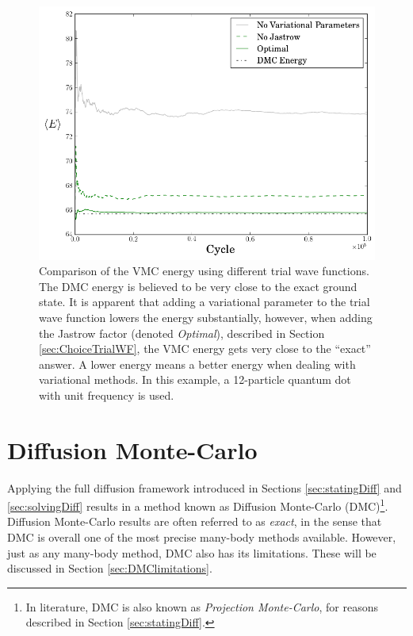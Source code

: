 \begin{figure}
 \begin{center}
  \includegraphics[scale=0.65]{../Graphics/WFComp.png}
  \caption{Comparison of the VMC energy using different trial wave functions. The DMC energy is believed to be very close to the exact ground state. It is apparent that adding a variational parameter to the trial wave function lowers the energy substantially, however, when adding the Jastrow factor (denoted \textit{Optimal}), described in Section \ref{sec:ChoiceTrialWF}, the VMC energy gets very close to the ``exact'' answer. A lower energy means a better energy when dealing with variational methods. In this example, a 12-particle quantum dot with unit frequency is used.}
  \label{fig:VMC_wfcomp}
 \end{center}
\end{figure}

\section{Diffusion Monte-Carlo}
\label{sec:DMC}

Applying the full diffusion framework introduced in Sections \ref{sec:statingDiff} and \ref{sec:solvingDiff} results in a method known as Diffusion Monte-Carlo (DMC)\footnote{In literature, DMC is also known as \textit{Projection Monte-Carlo}, for reasons described in Section \ref{sec:statingDiff}.}. Diffusion Monte-Carlo results are often referred to as \textit{exact}, in the sense that DMC is overall one of the most precise many-body methods available. However, just as any many-body method, DMC also has its limitations. These will be discussed in Section \ref{sec:DMClimitations}.

